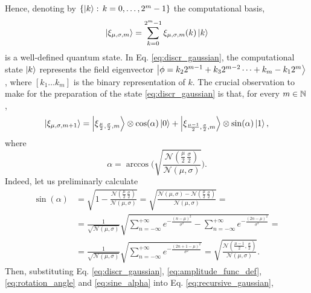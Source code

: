 \documentclass[a4paper,10pt]{report}
\begin{document}
Hence, denoting by $\{\ket{k}:\,k=0,\dots,2^m-1\}$ the computational basis,
\begin{equation}
\ket{\xi_{\mu,\sigma,m}} = \sum_{k=0}^{2^m-1}\xi_{\mu,\sigma,m}(k)\ket{k}
\label{eq:discr_gaussian}
\end{equation}
is a well-defined quantum state. In Eq. \eqref{eq:discr_gaussian}, the computational state $\ket{k}$ represents the field eigenvector $\ket{\phi = k_22^{m-1}+k_32^{m-2}\dots+k_m-k_12^m}$, where $[k_1\dots k_m]$ is the binary representation of $k$. The crucial observation to make for the preparation of the state \eqref{eq:discr_gaussian} is that, for every $m\in\mathbb{N}$, 
\begin{equation}
\ket{\xi_{\mu,\sigma,m+1}} = \ket{\xi_{\frac{\mu}{2},\frac{\sigma}{2},m}}\otimes\cos(\alpha)\ket{0} + \ket{\xi_{\frac{\mu-1}{2},\frac{\sigma}{2},m}}\otimes\sin(\alpha)\ket{1},
\label{eq:recursive_gaussian}
\end{equation}
where
\begin{equation}
\alpha = \arccos\Bigg(\sqrt{\frac{\mathcal{N}(\frac{\mu}{2}\,\frac{\sigma}{2})}{\mathcal{N}(\mu,\sigma)}}\Bigg).
\label{eq:rotation_angle}
\end{equation}
Indeed, let us preliminarly calculate
\begin{align}
\sin(\alpha) &= \sqrt{1-\frac{\mathcal{N}(\frac{\mu}{2}\,\frac{\sigma}{2})}{\mathcal{N}(\mu,\sigma)}} = \sqrt{\frac{\mathcal{N}(\mu,\sigma)-\mathcal{N}(\frac{\mu}{2}\,\frac{\sigma}{2})}{\mathcal{N}(\mu,\sigma)}} = \nonumber\\
&=\frac{1}{\sqrt{\mathcal{N}(\mu,\sigma)}}\sqrt{\sum_{n=-\infty}^{+\infty}e^{-\frac{(n-\mu)^2}{\sigma^2}} - \sum_{n=-\infty}^{+\infty}e^{-\frac{(2n-\mu)^2}{\sigma^2}}} = \nonumber\\
&=\frac{1}{\sqrt{\mathcal{N}(\mu,\sigma)}}\sqrt{\sum_{n=-\infty}^{+\infty}e^{-\frac{(2n+1-\mu)^2}{\sigma^2}}} = \sqrt{\frac{\mathcal{N}(\frac{\mu-1}{2},\frac{\sigma}{2})}{\mathcal{N}(\mu,\sigma)}}.
\label{eq:sine_alpha}
\end{align}
Then, substituting Eq. \eqref{eq:discr_gaussian}, \eqref{eq:amplitude_func_def}, \eqref{eq:rotation_angle} and \eqref{eq:sine_alpha} into Eq. \eqref{eq:recursive_gaussian},
\end{document}
